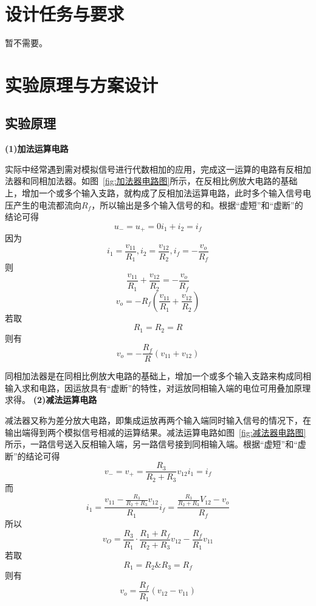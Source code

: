 \documentclass[10pt, a4paper]{article} %
\begin{document}
\section{设计任务与要求}

暂不需要。

\section{实验原理与方案设计}
\subsection{实验原理}
\textbf{(1)加法运算电路}

实际中经常遇到需对模拟信号进行代数相加的应用，完成这一运算的电路有反相加法器和同相加法器。如图~\hyperref[fig:加法器电路图]{\ref{fig:加法器电路图}}所示，在反相比例放大电路的基础上，增加一个或多个输入支路，就构成了反相加法运算电路，此时多个输入信号电压产生的电流都流向$R_f$，所以输出是多个输入信号的和。根据“虚短”和“虚断”的结论可得
$$
u_- = u_+ = 0 i_1 + i_2 = i_f
$$
因为 
$$
i_1 = \frac{v_{11}}{R_1}, i_2 = \frac{v_{12}}{R_2}, i_f = -\frac{v_o}{R_f}
$$
则
$$
\frac{v_{11}}{R_1} + \frac{v_{12}}{R_2} = -\frac{v_o}{R_f}
$$
$$
v_o = -R_f \left( \frac{v_{11}}{R_1} + \frac{v_{12}}{R_2} \right)
$$
若取
$$
R_1 = R_2 = R
$$
则有
$$
v_o = -\frac{R_f}{R} \left( v_{11} + v_{12} \right)
$$

同相加法器是在同相比例放大电路的基础上，增加一个或多个输入支路来构成同相输入求和电路，因运放具有“虚断”的特性，对运放同相输入端的电位可用叠加原理求得。
\clearpage
\textbf{(2)减法运算电路}

减法器又称为差分放大电路，即集成运放再两个输入端同时输入信号的情况下，在输出端得到两个模拟信号相减的运算结果。减法运算电路如图~\hyperref[fig:减法器电路图]{\ref{fig:减法器电路图}}所示，一路信号送入反相输入端，另一路信号接到同相输入端。根据“虚短”和“虚断”的结论可得
$$
v_{-} = v_{+} = \frac{R_3}{R_2+R_3}v_{12}  
i_1 = i_f
$$
而
$$
i_1 = \frac{v_{11}-\frac{R_3}{R_2+R_3}v_12}{R_1} 
i_f = \frac{\frac{R_3}{R_2+R_3}V_{12} - v_o}{R_f}
$$
所以
$$
v_O = \frac{R_3}{R_1}\cdot\frac{R_1+R_f}{R_2+R_3}v_{12} - \frac{R_f}{R_1}v_{11} 
$$
若取
$$
R_1 = R_2 \& R_3=R_f
$$
则有
$$
v_o = \frac{R_f}{R_1}\left( v_{12} - v_{11} \right)
$$
\end{document}
